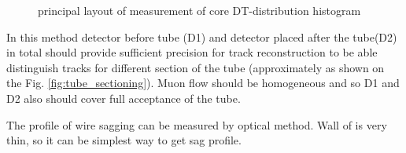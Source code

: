 \begin{figure}[h!]
	\caption{principal layout of measurement of core DT-distribution histogram}
	\label{fig:DT-mesure-layout}
	\end{figure}	
	
	In this method detector before tube (D1) and detector placed after the tube(D2) in total should provide sufficient precision for track reconstruction to be able distinguish tracks for different section of the tube (approximately as shown on the Fig. \ref{fig:tube_sectioning}). Muon flow should be homogeneous and so D1 and D2 also should cover full acceptance of the tube.
	
	The profile of wire sagging can be measured by optical method. Wall of is very thin, so it can be simplest way to get sag profile.
	